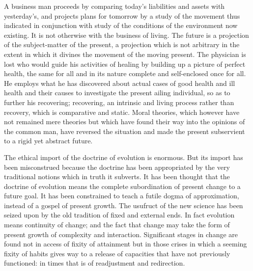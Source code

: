 \documentclass[12pt]{article}
\begin{document}
A business man proceeds by comparing today's liabilities
and assets with yesterday's, and projects plans
for tomorrow by a study of the movement thus indicated
in conjunction with study of the conditions of
the environment now existing. It is not otherwise with
the business of living. The future is a projection of the
subject-matter of the present, a projection which is not
arbitrary in the extent in which it divines the movement
of the moving present. The physician is lost who would
guide his activities of healing by building up a picture
of perfect health, the same for all and in its nature
complete and self-enclosed once for all. He employs
what he has discovered about actual cases of good
health and ill health and their causes to investigate the
present ailing individual, so as to further his recovering;
recovering, an intrinsic and living process rather
than recovery, which is comparative and static. Moral
theories, which however have not remained mere theories
but which have found their way into the opinions of
the common man, have reversed the situation and made
the present subservient to a rigid yet abstract future.

The ethical import of the doctrine of evolution is
enormous. But its import has been misconstrued because
the doctrine has been appropriated by the very
traditional notions which in truth it subverts. It has
been thought that the doctrine of evolution means the
complete subordination of present change to a future
goal. It has been constrained to teach a futile dogma
of approximation, instead of a gospel of present
growth. The usufruct of the new science has been
seized upon by the old tradition of fixed and external
ends. In fact evolution means continuity of change;
and the fact that change may take the form of present
growth of complexity and interaction. Significant
stages in change are found not in access of fixity of
attainment but in those crises in which a seeming fixity
of habits gives way to a release of capacities that have
not previously functioned: in times that is of readjustment
and redirection.
\end{document}
